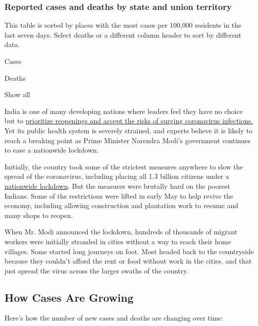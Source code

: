 \hypertarget{reported-cases-and-deaths-by-state-and-union-territory}{%
\subsubsection{Reported cases and deaths by state and union
territory}\label{reported-cases-and-deaths-by-state-and-union-territory}}

This table is sorted by places with the most cases per 100,000 residents
in the last seven days. Select deaths or a different column header to
sort by different data.

Cases

Deaths

Show all

India is one of many developing nations where leaders feel they have no
choice but to
\href{https://www.nytimes3xbfgragh.onion/2020/06/10/world/asia/reopening-before-coronavirus-ends.html}{prioritize
reopenings and accept the risks of surging coronavirus infections.} Yet
its public health system is severely strained, and experts believe it is
likely to reach a breaking point as Prime Minister Narendra Modi's
government continues to ease a nationwide lockdown.

Initially, the country took some of the strictest measures anywhere to
slow the spread of the coronavirus, including placing all 1.3 billion
citizens under a
\href{https://www.nytimes3xbfgragh.onion/2020/03/24/world/asia/india-coronavirus-lockdown.html}{nationwide
lockdown}. But the measures were brutally hard on the poorest Indians.
Some of the restrictions were lifted in early May to help revive the
economy, including allowing construction and plantation work to resume
and many shops to reopen.

When Mr. Modi announced the lockdown, hundreds of thousands of migrant
workers were initially stranded in cities without a way to reach their
home villages. Some started long journeys on foot. Most headed back to
the countryside because they couldn't afford the rent or food without
work in the cities, and that just spread the virus across the larger
swaths of the country.

\hypertarget{how-cases-are-growing}{%
\subsection{How Cases Are Growing}\label{how-cases-are-growing}}

Here's how the number of new cases and deaths are changing over time:

